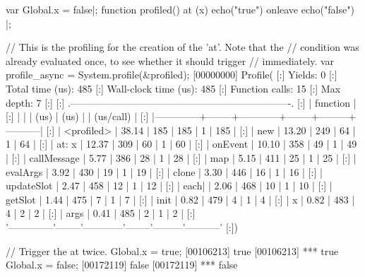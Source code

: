 \begin{urbiscript}
var Global.x = false|;
function profiled()
{
  at (x)
    echo("true")
  onleave
    echo("false")
}|;

// This is the profiling for the creation of the 'at'. Note that the
// condition was already evaluated once, to see whether it should trigger
// immediately.
var profile_async = System.profile(&profiled);
[00000000] Profile(
[:]  Yields:                    0
[:]  Total time (us):         485
[:]  Wall-clock time (us):    485
[:]  Function calls:           15
[:]  Max depth:                 7
[:]
[:]  .-------------------------------------------------------------------.
[:]  |   function   |   %
[:]  |              |        |    (us)    |  (us)  |         | (us/call) |
[:]  |--------------+--------+------------+--------+---------+-----------|
[:]  |   <profiled> |  38.14 |        185 |    185 |       1 |       185 |
[:]  |          new |  13.20 |        249 |     64 |       1 |        64 |
[:]  |    at: { x } |  12.37 |        309 |     60 |       1 |        60 |
[:]  |      onEvent |  10.10 |        358 |     49 |       1 |        49 |
[:]  |  callMessage |   5.77 |        386 |     28 |       1 |        28 |
[:]  |          map |   5.15 |        411 |     25 |       1 |        25 |
[:]  |     evalArgs |   3.92 |        430 |     19 |       1 |        19 |
[:]  |        clone |   3.30 |        446 |     16 |       1 |        16 |
[:]  |   updateSlot |   2.47 |        458 |     12 |       1 |        12 |
[:]  |        each| |   2.06 |        468 |     10 |       1 |        10 |
[:]  |      getSlot |   1.44 |        475 |      7 |       1 |         7 |
[:]  |         init |   0.82 |        479 |      4 |       1 |         4 |
[:]  |            x |   0.82 |        483 |      4 |       2 |         2 |
[:]  |         args |   0.41 |        485 |      2 |       1 |         2 |
[:]  '--------------'--------'------------'--------'---------'-----------'
[:])

// Trigger the at twice.
Global.x = true;
[00106213] true
[00106213] *** true
Global.x = false;
[00172119] false
[00172119] *** false


\end{urbiscript}
